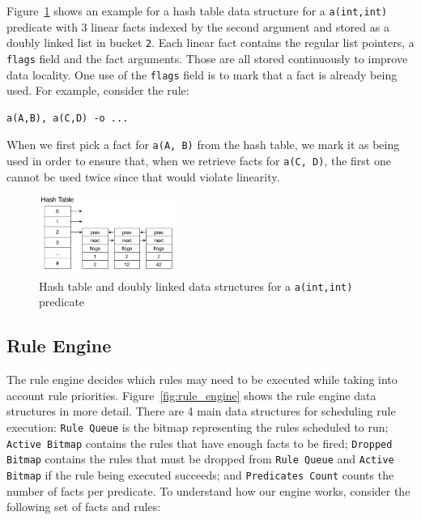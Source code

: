 \documentclass{sigplanconf}
\begin{document}
Figure~\ref{fig:hash_table} shows an example for a hash table data
structure for a \texttt{a(int,int)} predicate with 3 linear facts
indexed by the second argument and stored as a doubly linked list in
bucket \texttt{2}. Each linear fact contains the regular list
pointers, a \texttt{flags} field and the fact arguments. Those are all
stored continuously to improve data locality. One use of
the \texttt{flags} field is to mark that a fact is already being
used. For example, consider the rule:

{\footnotesize
\begin{Verbatim}
a(A,B), a(C,D) -o ...
\end{Verbatim}
}

When we first pick a fact for \texttt{a(A, B)} from the hash
table, we mark it as being used in order to ensure that, when we
retrieve facts for \texttt{a(C, D)}, the first one cannot be used
twice since that would violate linearity.

\begin{figure}[ht]
\centering
\includegraphics[width=0.4\textwidth]{figures/hash_table.pdf}
\caption{Hash table and doubly linked data structures for 
  a \texttt{a(int,int)} predicate}
\label{fig:hash_table}
\end{figure}


\subsection{Rule Engine}
\label{rule_engine}

The rule engine decides which rules may need to be executed while
taking into account rule priorities. Figure~\ref{fig:rule_engine}
shows the rule engine data structures in more detail. There are 4 main
data structures for scheduling rule execution: \texttt{Rule Queue} is
the bitmap representing the rules scheduled to run; \texttt{Active
Bitmap} contains the rules that have enough facts to be
fired; \texttt{Dropped Bitmap} contains the rules that must be dropped
from \texttt{Rule Queue} and \texttt{Active Bitmap} if the rule being
executed succeeds; and \texttt{Predicates Count} counts the number of
facts per predicate. To understand how our engine works, consider the
following set of facts and rules:
\end{document}
